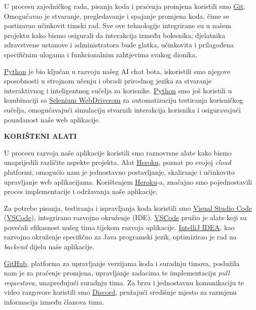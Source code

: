 U procesu zajedničkog rada, pisanja koda i praćenja promjena koristili smo \href{https://git-scm.com/}{Git}. Omogućavao je stvaranje, pregledavanje i spajanje promjena koda, čime se postizavao učinkovit timski rad. Sve ove tehnologije integrirane su u našem projektu kako bismo osigurali da interakcija između bolesnika, djelatnika zdravstvene ustanove i administratora bude glatka, učinkovita i prilagođena specifičnim ulogama i funkcionalnim zahtjevima svakog dionika.

\href{https://www.python.org/}{Python} je bio ključan u razvoju našeg AI chat bota, iskoristili smo njegove sposobnosti u strojnom učenju i obradi prirodnog jezika za stvaranje interaktivnog i inteligentnog sučelja za korisnike. \href{https://www.python.org/}{Python} smo još koristili u kombinaciji sa \href{https://www.selenium.dev/documentation/webdriver/}{Selenium WebDriverom} za automatizaciju testiranja korisničkog sučelja, omogućavajući simulaciju stvarnih interakcija korisnika i osiguravajući pouzdanost naše web aplikacije.

\textbf{KORIŠTENI ALATI
}

U procesu razvoja naše aplikacije koristili smo raznovrsne alate kako bismo unaprijedili različite aspekte projekta. Alat \href{https://www.heroku.com}{Heroku}, poznat po svojoj \textit{cloud} platformi, omogućio nam je jednostavno postavljanje, skaliranje i učinkovito upravljanje web aplikacijama. Korištenjem \href{https://www.heroku.com}{Heroku}-a, značajno smo pojednostavili proces implementacije i održavanja naše aplikacije.

Za potrebe pisanja, testiranja i ispravljanja koda koristili smo \href{https://www.visualstudio.com}{Visual Studio Code} (\href{https://www.visualstudio.com}{VSCode}), integrirano razvojno okruženje (IDE). \href{https://www.visualstudio.com}{VSCode} pružio je alate koji su povećali efikasnost našeg tima tijekom razvoja aplikacije. \href{https://www.jetbrains.com/idea}{IntelliJ IDEA}, kao razvojno okruženje specifično za Java programski jezik, optimizirao je rad na \textit{backend} dijelu naše aplikacije. 

\href{https://github.com}{GitHub}, platforma za upravljanje verzijama koda i suradnju timova, poslužila nam je za praćenje promjena, upravljanje zadacima te implementaciju \textit{pull requestova}, unapređujući suradnju tima. Za brzu i jednostavnu komunikaciju te video razgovore koristili smo \href{https://discord.com}{Discord}, pružajući središnje mjesto za razmjenu informacija između članova tima.


